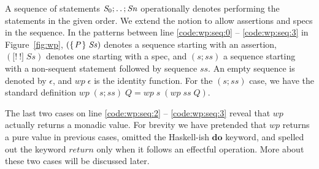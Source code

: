 \documentclass[runningheads]{llncs}
\newcommand{\Conid}[1]{\mathit{#1}}
\newcommand{\Varid}[1]{\mathit{#1}}
\let\Varid\mathit
\let\Conid\mathit
\newcommand{\todo}[1]{{\bf Todo}: \lbrack #1 \rbrack}
\begin{document}
A sequence of statements \ensuremath{\Conid{S}_{0};\mathinner{\ldotp\ldotp};\Conid{Sn}} operationally denotes performing the statements in the given order.
We extend the notion to allow assertions and specs in the sequence.
In the patterns between line \ref{code:wp:seq:0} -- \ref{code:wp:seq:3} in Figure~\ref{fig:wp},
\ensuremath{(\{\mskip1.5mu \Conid{P}\mskip1.5mu\}\;\Conid{Ss})} denotes a sequence starting with an assertion,
\ensuremath{(\lbrack!~!\rbrack\;\Conid{Ss})} denotes one starting with a spec,
and \ensuremath{(\Varid{s};\Varid{ss})} a sequence starting with a non-sequent statement followed by sequence \ensuremath{\Varid{ss}}.
An empty sequence is denoted by \ensuremath{\epsilon}, and \ensuremath{\Varid{wp}\;\epsilon} is the identity function.
For the \ensuremath{(\Varid{s};\Varid{ss})} case, we have the standard definition \ensuremath{\Varid{wp}\;(\Varid{s};\Varid{ss})\;\Conid{Q}\mathrel{=}\Varid{wp}\;\Varid{s}\;(\Varid{wp}\;\Varid{ss}\;\Conid{Q})}.

The last two cases on line \ref{code:wp:seq:2} -- \ref{code:wp:seq:3} reveal that \ensuremath{\Varid{wp}} actually returns a monadic value.
For brevity we have pretended that \ensuremath{\Varid{wp}} returns a pure value in previous cases,
omitted the Haskell-ish \ensuremath{\mathbf{do}} keyword,
and spelled out the keyword \ensuremath{\Varid{return}} only when it follows an effectful operation.
More about these two cases will be discussed later.

\end{document}

